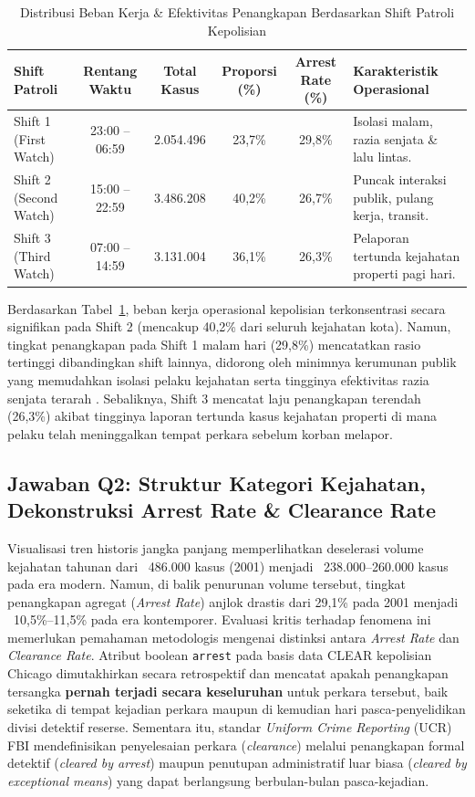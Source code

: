 \documentclass[11pt,a4paper]{article}
\begin{document}
\begin{table}[h]
\centering
\small
\caption{Distribusi Beban Kerja \& Efektivitas Penangkapan Berdasarkan Shift Patroli Kepolisian}
\label{tab:shift}
\begin{tabularx}{\textwidth}{lccccX}
\toprule
\textbf{Shift Patroli} & \textbf{Rentang Waktu} & \textbf{Total Kasus} & \textbf{Proporsi (\%)} & \textbf{Arrest Rate (\%)} & \textbf{Karakteristik Operasional} \\
\midrule
Shift 1 (First Watch) & 23:00 -- 06:59 & 2.054.496 & 23,7\% & 29,8\% & Isolasi malam, razia senjata \& lalu lintas. \\
Shift 2 (Second Watch) & 15:00 -- 22:59 & 3.486.208 & 40,2\% & 26,7\% & Puncak interaksi publik, pulang kerja, transit. \\
Shift 3 (Third Watch) & 07:00 -- 14:59 & 3.131.004 & 36,1\% & 26,3\% & Pelaporan tertunda kejahatan properti pagi hari. \\
\bottomrule
\end{tabularx}
\end{table}

Berdasarkan Tabel~\ref{tab:shift}, beban kerja operasional kepolisian terkonsentrasi secara signifikan pada Shift 2 (mencakup 40,2\% dari seluruh kejahatan kota). Namun, tingkat penangkapan pada Shift 1 malam hari (29,8\%) mencatatkan rasio tertinggi dibandingkan shift lainnya, didorong oleh minimnya kerumunan publik yang memudahkan isolasi pelaku kejahatan serta tingginya efektivitas razia senjata terarah \cite{towers2018}. Sebaliknya, Shift 3 mencatat laju penangkapan terendah (26,3\%) akibat tingginya laporan tertunda kasus kejahatan properti di mana pelaku telah meninggalkan tempat perkara sebelum korban melapor.

\subsection{Jawaban Q2: Struktur Kategori Kejahatan, Dekonstruksi Arrest Rate \& Clearance Rate}
Visualisasi tren historis jangka panjang memperlihatkan deselerasi volume kejahatan tahunan dari ~486.000 kasus (2001) menjadi ~238.000--260.000 kasus pada era modern. Namun, di balik penurunan volume tersebut, tingkat penangkapan agregat (\textit{Arrest Rate}) anjlok drastis dari 29,1\% pada 2001 menjadi ~10,5\%--11,5\% pada era kontemporer. Evaluasi kritis terhadap fenomena ini memerlukan pemahaman metodologis mengenai distinksi antara \textit{Arrest Rate} dan \textit{Clearance Rate}. Atribut boolean \texttt{arrest} pada basis data CLEAR kepolisian Chicago dimutakhirkan secara retrospektif dan mencatat apakah penangkapan tersangka \textbf{pernah terjadi secara keseluruhan} untuk perkara tersebut, baik seketika di tempat kejadian perkara maupun di kemudian hari pasca-penyelidikan divisi detektif reserse. Sementara itu, standar \textit{Uniform Crime Reporting} (UCR) FBI mendefinisikan penyelesaian perkara (\textit{clearance}) melalui penangkapan formal detektif (\textit{cleared by arrest}) maupun penutupan administratif luar biasa (\textit{cleared by exceptional means}) yang dapat berlangsung berbulan-bulan pasca-kejadian.
\end{document}
